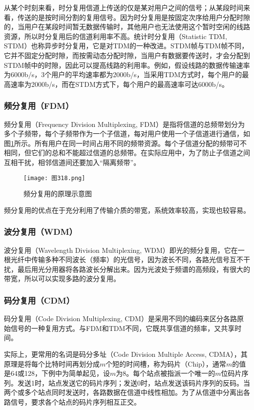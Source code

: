 \documentclass{ctexbook}
\begin{document}
	从某个时刻来看，时分复用信道上传送的仅是某对用户之间的信号；从某段时间来看，传送的是按时间分割的复用信号。因为时分复用是按固定次序给用户分配时隙的，当用户在某段时间暂无数据传输时，其他用户也无法使用这个暂时空闲的线路资源，所以时分复用后的信道利用率不高。统计时分复用（Statistic TDM, STDM）也称异步时分复用，它是对TDM的一种改进。STDM帧与TDM帧不同，它并不固定分配时隙，而按需动态分配时隙，当用户有数据要传送时，才会分配到STDM帧中的时隙，因此可以提高线路的利用率。例如，假设线路的数据传输速率为6000b/s，3个用户的平均速率都为2000b/s，当采用TDM方式时，每个用户的最高速率为2000b/s，而在STDM方式下，每个用户的最高速率可达6000b/s。
	
	\subsubsection{频分复用（FDM）}
	频分复用（Frequency Division Multiplexing, FDM）是指将信道的总频带划分为多个子频带，每个子频带作为一个子信道，每对用户使用一个子信道进行通信，如图\ref{fig:fdm_principle}所示。所有用户在同一时间占用不同的频带资源。每个子信道分配的频带可不相同，但它们的总和不能超过信道的总频带。在实际应用中，为了防止子信道之间互相干扰，相邻信道间还要加入“隔离频带”。
	
	\begin{figure}[h]
		\centering
		\caption{频分复用的原理示意图}
		\label{fig:fdm_principle}
		\texttt{[image: 图318.png]} %
	\end{figure}
	
	频分复用的优点在于充分利用了传输介质的带宽，系统效率较高，实现也较容易。
	
	\subsubsection{波分复用（WDM）}
	波分复用（Wavelength Division Multiplexing, WDM）即光的频分复用，它在一根光纤中传输多种不同波长（频率）的光信号，因为波长不同，各路光信号互不干扰，最后用光分用器将各路波长分解出来。因为光波处于频谱的高频段，有很大的带宽，所以可以实现多路的波分复用。
	
	\subsubsection{码分复用（CDM）}
	码分复用（Code Division Multiplexing, CDM）是采用不同的编码来区分各路原始信号的一种复用方式。与FDM和TDM不同，它既共享信道的频率，又共享时间。
	
	实际上，更常用的名词是码分多址（Code Division Multiple Access, CDMA），其原理是将每个比特时间再划分成$m$个短的时间槽，称为码片（Chip），通常$m$的值是64或128，下例中为简单起见，设$m$为8。每个站点被指派一个唯一的$m$位码片序列。发送1时，站点发送它的码片序列；发送0时，站点发送该码片序列的反码。当两个或多个站点同时发送时，各路数据在信道中线性相加。为了从信道中分离出各路信号，要求各个站点的码片序列相互正交。
	
\end{document}

